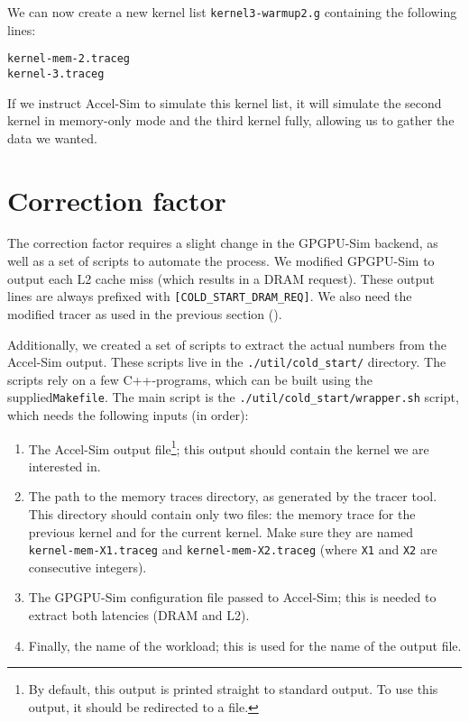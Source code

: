 We can now create a new kernel list \verb|kernel3-warmup2.g| containing the following lines:
\begin{verbatim}
kernel-mem-2.traceg
kernel-3.traceg
\end{verbatim}

If we instruct Accel-Sim to simulate this kernel list, it will simulate the second kernel in memory-only mode and the third kernel fully, allowing us to gather the data we wanted.

\section{Correction factor}\label{sec:repo-corr-fac}
The correction factor requires a slight change in the GPGPU-Sim backend, as well as a set of scripts to automate the process.
We modified GPGPU-Sim to output each L2 cache miss (which results in a DRAM request).
These output lines are always prefixed with \verb|[COLD_START_DRAM_REQ]|.
We also need the modified tracer as used in the previous section ().

Additionally, we created a set of scripts to extract the actual numbers from the Accel-Sim output.
These scripts live in the \verb|./util/cold_start/| directory.
The scripts rely on a few C++-programs, which can be built using the supplied\space\verb|Makefile|.
The main script is the \verb|./util/cold_start/wrapper.sh| script, which needs the following inputs (in order):
\begin{enumerate}
    \item The Accel-Sim output file\footnote{By default, this output is printed straight to standard output. To use this output, it should be redirected to a file.}; this output should contain the kernel we are interested in.
    \item The path to the memory traces directory, as generated by the tracer tool.
    This directory should contain only two files: the memory trace for the previous kernel and for the current kernel.
    Make sure they are named \verb|kernel-mem-X1.traceg| and \verb|kernel-mem-X2.traceg| (where \verb|X1| and \verb|X2| are consecutive integers).
    \item The GPGPU-Sim configuration file passed to Accel-Sim; this is needed to extract both latencies (DRAM and L2).
    \item Finally, the name of the workload; this is used for the name of the output file.
\end{enumerate}

